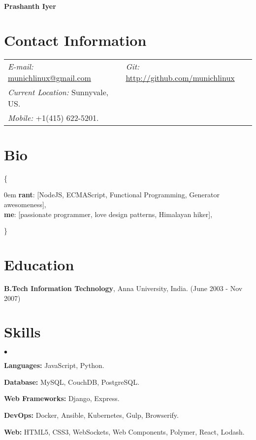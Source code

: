 \documentclass[margin, line, 10pt]{res}
\newenvironment{list2}{
  \begin{list}{$\bullet$}{%
      \setlength{\itemsep}{0in}
      \setlength{\parsep}{0in} \setlength{\parskip}{0in}
      \setlength{\topsep}{0in} \setlength{\partopsep}{0in}
      \setlength{\leftmargin}{0.2in}}}{\end{list}}
\begin{document}
 \textbf{\LARGE Prashanth Iyer}
\vspace{.15cm} \\
\vspace{-.05cm}
\begin{resume}

\section{Contact Information}
\vspace{.05in}
\begin{tabular}{@{}p{3in}p{3in}}
{\it E-mail:} \href{mailto:munichlinux@gmail.com}{munichlinux@gmail.com} & {\it Git:} \href{http://github.com/munichlinux}{http://github.com/munichlinux} \\
{\it Current Location:} Sunnyvale, US. \\
{\it Mobile:}  +1(415) 622-5201.
\end{tabular}

\section{Bio}
\{
  \begin{addmargin}[1em]{0em}
  {\bf rant}: [NodeJS, ECMAScript, Functional Programming, Generator awesomeness],\\
  {\bf me}: [passionate programmer, love design patterns, Himalayan hiker],
  \end{addmargin}
  \vspace{-.15in}
\}

\section{Education}
{\bf B.Tech Information Technology}, Anna University, India. \hfill (June 2003 - Nov 2007)

\section{Skills}
\begin{list2}
\item {\bf Languages:} JavaScript, Python.\\
\vspace{-.3cm}
\item {\bf Database:} MySQL, CouchDB, PostgreSQL.\\
\vspace{-.3cm}
\item {\bf Web Frameworks:} Django, Express.\\
\vspace{-.3cm}
\item {\bf DevOps:} Docker, Ansible, Kubernetes, Gulp, Browserify.\\
\vspace{-.3cm}
\item {\bf Web:} HTML5, CSS3, WebSockets, Web Components, Polymer, React, Lodash.\\
\vspace{-.3cm}
\end{list2}


\end{resume}
\end{document}
